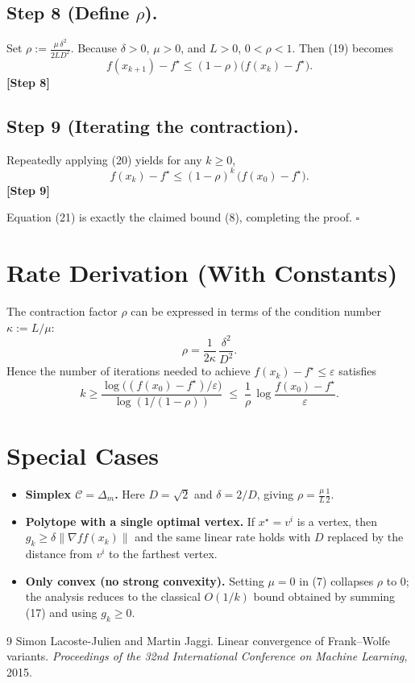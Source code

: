 \documentclass[11pt]{article}
\newcommand{\C}{\mathcal{C}}
\newcommand{\width}{\delta}
\newcommand{\grad}{\nabla f}
\begin{document}
\subsection*{Step 8 (Define $\rho$).}
Set $\rho:=\frac{\mu\,\width^{2}}{2L D^{2}}$.
Because $\width>0$, $\mu>0$, and $L>0$, $0<\rho<1$.
Then (19) becomes
\[
f(x_{k+1})-f^{\star}\le (1-\rho)\bigl(f(x_{k})-f^{\star}\bigr).
\tag{20}
\]
\textbf{[Step 8]}

\subsection*{Step 9 (Iterating the contraction).}
Repeatedly applying (20) yields for any $k\ge0$,
\[
f(x_{k})-f^{\star}\le (1-\rho)^{k}\,\bigl(f(x_{0})-f^{\star}\bigr).
\tag{21}
\]
\textbf{[Step 9]}

Equation (21) is exactly the claimed bound (8), completing the proof. $\square$

\section*{Rate Derivation (With Constants)}
The contraction factor $\rho$ can be expressed in terms of the condition number $\kappa:=L/\mu$:
\[
\rho = \frac{1}{2\kappa}\,\frac{\width^{2}}{D^{2}}.
\tag{22}
\]
Hence the number of iterations needed to achieve $f(x_{k})-f^{\star}\le\varepsilon$ satisfies
\[
k\ge \frac{\log\!\bigl((f(x_{0})-f^{\star})/\varepsilon\bigr)}
{\log(1/(1-\rho))}
\;\le\;
\frac{1}{\rho}\,
\log\!\frac{f(x_{0})-f^{\star}}{\varepsilon}.
\tag{23}
\]

\section*{Special Cases}
\begin{itemize}
\item \textbf{Simplex $\C=\Delta_{m}$.}
Here $D=\sqrt{2}$ and $\width=2/D$, giving $\rho=\frac{\mu}{L}\frac{1}{2}$.
\item \textbf{Polytope with a single optimal vertex.}
If $x^{\star}=v^{i}$ is a vertex, then $g_{k}\ge\width\|\grad f(x_{k})\|$ and the same linear rate holds with $D$ replaced by the distance from $v^{i}$ to the farthest vertex.
\item \textbf{Only convex (no strong convexity).}
Setting $\mu=0$ in (7) collapses $\rho$ to $0$; the analysis reduces to the classical $O(1/k)$ bound obtained by summing (17) and using $g_{k}\ge0$.
\end{itemize}


\begin{thebibliography}{9}
Simon Lacoste-Julien and Martin Jaggi.
\newblock Linear convergence of Frank–Wolfe variants.
\newblock \emph{Proceedings of the 32nd International Conference on Machine Learning}, 2015.
\end{thebibliography}
\end{document}
